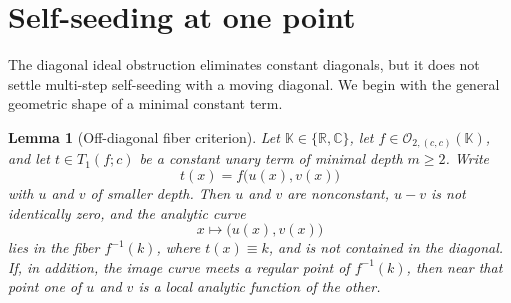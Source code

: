 \documentclass[11pt]{amsart}
\numberwithin{equation}{section}
\newtheorem{lemma}[theorem]{Lemma}
\theoremstyle{remark}
\theoremstyle{definition}
\newcommand{\C}{\mathbb{C}}
\newcommand{\R}{\mathbb{R}}
\newcommand{\K}{\mathbb{K}}
\newcommand{\Oc}{\mathcal{O}}
\begin{document}
\section{Self-seeding at one point}\label{sec:one-point-self-seeding}

The diagonal ideal obstruction eliminates constant diagonals, but it does not settle multi-step self-seeding with a moving diagonal. We begin with the general geometric shape of a minimal constant term.

\begin{lemma}[Off-diagonal fiber criterion]\label{lem:fiber-criterion}
Let $\K\in\{\R,\C\}$, let $f\in \Oc_{2,(c,c)}(\K)$, and let $t\in T_1(f;c)$ be a constant unary term of minimal depth $m\geq 2$. Write
\[
t(x)=f\bigl(u(x),v(x)\bigr)
\]
with $u$ and $v$ of smaller depth. Then $u$ and $v$ are nonconstant, $u-v$ is not identically zero, and the analytic curve
\[
x\longmapsto \bigl(u(x),v(x)\bigr)
\]
lies in the fiber $f^{-1}(k)$, where $t(x)\equiv k$, and is not contained in the diagonal. If, in addition, the image curve meets a regular point of $f^{-1}(k)$, then near that point one of $u$ and $v$ is a local analytic function of the other.
\end{lemma}
\end{document}
